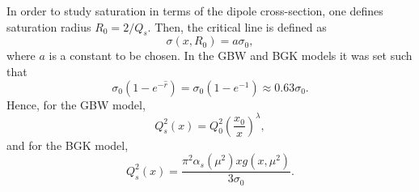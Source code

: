 \documentclass[11pt]{article}
\begin{document}
In order to study saturation in terms of the dipole cross-section, one defines saturation radius $R_0=2/Q_s$.  
Then, the critical line is defined as \cite{gbs2006}
\begin{equation}
\sigma(x,R_0)=a \sigma_0,
\end{equation}
where $a$ is a constant to be chosen.
In the GBW and BGK models it was set such that 
\begin{equation}
\sigma_0\left(1-e^{-\hat{r}}\right)=\sigma_0 \left(1-e^{-1}\right)\approx 0.63 \sigma_0.
\end{equation}
Hence, for the GBW model,  
\begin{equation}
Q_s^2(x) =Q_0^2\left(\frac{x_0}{x}\right)^{\lambda},
\end{equation}
and for the BGK model,
\begin{equation}
Q^2_s(x)= \frac{\pi^2 \alpha_s(\mu^2) x g(x,\mu^2)}{3 \sigma_0}.
\end{equation}
\end{document}
